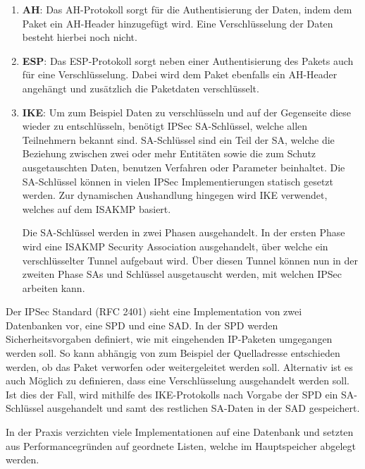 \begin{enumerate}
    \item \textbf{\gls{AH}}: Das \gls{AH}-Protokoll sorgt für die Authentisierung der Daten, indem dem Paket ein \gls{AH}-Header hinzugefügt wird. Eine Verschlüsselung der Daten besteht hierbei noch nicht.
    \item \textbf{\gls{ESP}}: Das \gls{ESP}-Protokoll sorgt neben einer Authentisierung des Pakets auch für eine Verschlüsselung. Dabei wird dem Paket ebenfalls ein \gls{AH}-Header angehängt und zusätzlich die Paketdaten verschlüsselt.
    \item \textbf{\gls{IKE}}: Um zum Beispiel Daten zu verschlüsseln und auf der Gegenseite diese wieder zu entschlüsseln, benötigt \gls{IPSec} \gls{SA}-Schlüssel, welche allen Teilnehmern bekannt sind. \gls{SA}-Schlüssel sind ein Teil der \acrfull{SA}, welche die Beziehung zwischen zwei oder mehr Entitäten sowie die zum Schutz ausgetauschten Daten, benutzen Verfahren oder Parameter beinhaltet. Die \gls{SA}-Schlüssel können in vielen \gls{IPSec} Implementierungen statisch gesetzt werden. Zur dynamischen Aushandlung hingegen wird \acrfull{IKE} verwendet, welches auf dem \gls{ISAKMP} basiert.

    Die \gls{SA}-Schlüssel werden in zwei Phasen ausgehandelt. In der ersten Phase wird eine \gls{ISAKMP} Security Association ausgehandelt, über welche ein verschlüsselter Tunnel aufgebaut wird. Über diesen Tunnel können nun in der zweiten Phase \gls{SA}s und Schlüssel ausgetauscht werden, mit welchen \gls{IPSec} arbeiten kann.
\end{enumerate}

Der \gls{IPSec} Standard (\gls{RFC} 2401) sieht eine Implementation von zwei Datenbanken vor, eine \gls{SPD} und eine \gls{SAD}. In der \gls{SPD} werden  Sicherheitsvorgaben definiert, wie mit eingehenden \gls{IP}-Paketen umgegangen werden soll. So kann abhängig von zum Beispiel der Quelladresse entschieden werden, ob das Paket verworfen oder weitergeleitet werden soll. Alternativ ist es auch Möglich zu definieren, dass eine Verschlüsselung ausgehandelt werden soll. Ist dies der Fall, wird mithilfe des \gls{IKE}-Protokolls nach Vorgabe der \gls{SPD} ein \gls{SA}-Schlüssel ausgehandelt und samt des restlichen \gls{SA}-Daten in der \gls{SAD} gespeichert. \cite{BSI_VPN_10, RFC2401, Ipsec_VPN_Design, Guide_to_IPsec_VPNs}

In der Praxis verzichten viele Implementationen auf eine Datenbank und setzten aus Performancegründen auf geordnete Listen, welche im Hauptspeicher abgelegt werden. \cite{BSI_VPN_10}

